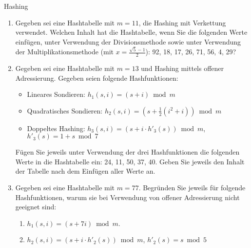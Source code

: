 \documentclass[11pt,a4paper]{article}
\begin{document}
\thispagestyle{empty}

\newcommand{\quotes}[1]{\glqq{}#1\grqq{}}




\begin{aufgabe}{1}{Hashing}
    \begin{enumerate}
        \item Gegeben sei eine Hashtabelle mit $m = 11$, die Hashing mit Verkettung verwendet.
        Welchen Inhalt hat die Hashtabelle, wenn Sie die folgenden Werte einfügen, unter Verwendung der Divisionsmethode sowie unter Verwendung der Multiplikationsmethode (mit $x = \frac{\sqrt{5} - 1}{2}$):
        92, 18, 17, 26, 71, 56, 4, 29?
        \item Gegeben sei eine Hashtabelle mit $m = 13$ und Hashing mittels offener Adressierung.
        Gegeben seien folgende Hashfunktionen:
        \begin{itemize}
            \item Lineares Sondieren: $h_1(s, i) = (s + i) \bmod m$
            \item Quadratisches Sondieren: $h_2(s, i) = (s + \frac{1}{2} (i^2 + i)) \bmod m$
            \item Doppeltes Hashing: $h_3(s, i) = (s + i \cdot h'_3(s)) \bmod m$, $h'_3(s) = 1 + s \bmod 7$
        \end{itemize}
        Fügen Sie jeweils unter Verwendung der drei Hashfunktionen die folgenden Werte in die Hashtabelle ein:
        24, 11, 50, 37, 40.
        Geben Sie jeweils den Inhalt der Tabelle nach dem Einfügen aller Werte an.
        \item
        Gegeben sei eine Hashtabelle mit $m = 77$.
        Begründen Sie jeweils für folgende Hashfunktionen, warum sie bei Verwendung von offener Adressierung nicht geeignet sind:
        \begin{enumerate}[label=\roman*)]
            \item $h_1(s, i) = (s + 7i) \bmod{m}$.
            \item $h_2(s, i) = (s + i \cdot h'_2(s)) \bmod{m}$, $h'_2(s) = s \bmod 5$

\end{enumerate}
\end{enumerate}
\end{aufgabe}
\end{document}
